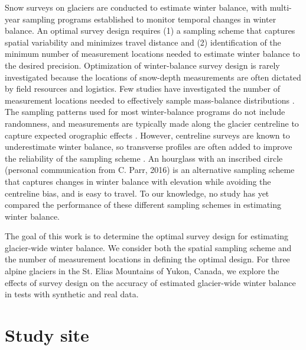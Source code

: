 \documentclass{article}
\begin{document}
Snow surveys on glaciers are conducted to estimate winter balance, with multi-year sampling programs established to monitor temporal changes in winter balance. An optimal survey design requires (1) a sampling scheme that captures spatial variability and minimizes travel distance and (2) identification of the minimum number of measurement locations needed to estimate winter balance to the desired precision.  Optimization of winter-balance survey design is rarely investigated because the locations of snow-depth measurements are often dictated by field resources and logistics. 
Few studies have investigated the number of measurement locations needed to effectively sample mass-balance distributions \citep[c.f.][]{Cogley1999, Fountain1999,Walmsley2015,Surjanovic2016}. The sampling patterns used for most winter-balance programs do not include randomness, and measurements are typically made along the glacier centreline \citep[e.g.][]{Kaser2002} to capture expected orographic effects \citep[e.g.][]{Grunewald2014}. However, centreline surveys are known to underestimate winter balance, so transverse profiles are often added to improve the reliability of the sampling scheme \citep[e.g.][]{Walmsley2015}. An hourglass with an inscribed circle (personal communication from C. Parr, 2016) is an alternative sampling scheme that captures changes in winter balance with elevation while avoiding the centreline bias, and is easy to travel. To our knowledge, no study has yet compared the performance of these different sampling schemes in estimating winter balance.

The goal of this work is to determine the optimal survey design for estimating glacier-wide winter balance. We consider both the spatial sampling scheme and the number of measurement locations in defining the optimal design. For three alpine glaciers in the St. Elias Mountains of Yukon, Canada, we explore the effects of survey design on the accuracy of estimated glacier-wide winter balance in tests with synthetic and real data.


\section{Study site}
\end{document}
